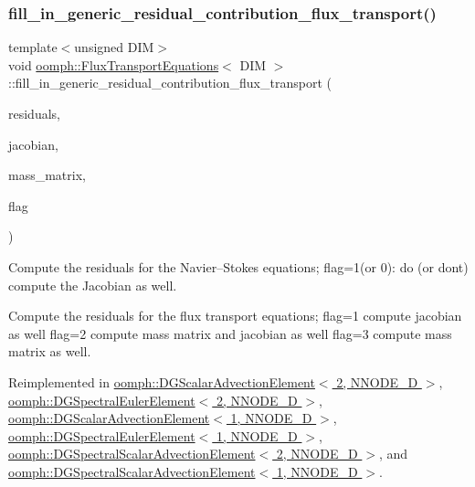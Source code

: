 \subsubsection{\texorpdfstring{fill\+\_\+in\+\_\+generic\+\_\+residual\+\_\+contribution\+\_\+flux\+\_\+transport()}{fill\_in\_generic\_residual\_contribution\_flux\_transport()}}
{\footnotesize\ttfamily template$<$unsigned D\+IM$>$ \\
void \hyperlink{classoomph_1_1FluxTransportEquations}{oomph\+::\+Flux\+Transport\+Equations}$<$ D\+IM $>$\+::fill\+\_\+in\+\_\+generic\+\_\+residual\+\_\+contribution\+\_\+flux\+\_\+transport (\begin{DoxyParamCaption}\item[{\hyperlink{classoomph_1_1Vector}{Vector}$<$ double $>$ \&}]{residuals,  }\item[{\hyperlink{classoomph_1_1DenseMatrix}{Dense\+Matrix}$<$ double $>$ \&}]{jacobian,  }\item[{\hyperlink{classoomph_1_1DenseMatrix}{Dense\+Matrix}$<$ double $>$ \&}]{mass\+\_\+matrix,  }\item[{unsigned}]{flag }\end{DoxyParamCaption})\hspace{0.3cm}{\ttfamily [virtual]}}



Compute the residuals for the Navier--Stokes equations; flag=1(or 0)\+: do (or don\textquotesingle{}t) compute the Jacobian as well. 

Compute the residuals for the flux transport equations; flag=1 compute jacobian as well flag=2 compute mass matrix and jacobian as well flag=3 compute mass matrix as well. 

Reimplemented in \hyperlink{classoomph_1_1DGScalarAdvectionElement_3_012_00_01NNODE__1D_01_4_a2c33e2b2f4e41b504d77bd86881f0869}{oomph\+::\+D\+G\+Scalar\+Advection\+Element$<$ 2, N\+N\+O\+D\+E\+\_\+D $>$}, \hyperlink{classoomph_1_1DGSpectralEulerElement_3_012_00_01NNODE__1D_01_4_a91aa95f61d0d91d89f3d899fbb4fdad3}{oomph\+::\+D\+G\+Spectral\+Euler\+Element$<$ 2, N\+N\+O\+D\+E\+\_\+D $>$}, \hyperlink{classoomph_1_1DGScalarAdvectionElement_3_011_00_01NNODE__1D_01_4_af3ef17f8ddb6034430fb873ea8dd4ba3}{oomph\+::\+D\+G\+Scalar\+Advection\+Element$<$ 1, N\+N\+O\+D\+E\+\_\+D $>$}, \hyperlink{classoomph_1_1DGSpectralEulerElement_3_011_00_01NNODE__1D_01_4_ae0ae9526ab9aae474a1e834f32dc2580}{oomph\+::\+D\+G\+Spectral\+Euler\+Element$<$ 1, N\+N\+O\+D\+E\+\_\+D $>$}, \hyperlink{classoomph_1_1DGSpectralScalarAdvectionElement_3_012_00_01NNODE__1D_01_4_a9eff513d77d731a1d2492289fd640cb0}{oomph\+::\+D\+G\+Spectral\+Scalar\+Advection\+Element$<$ 2, N\+N\+O\+D\+E\+\_\+D $>$}, and \hyperlink{classoomph_1_1DGSpectralScalarAdvectionElement_3_011_00_01NNODE__1D_01_4_ac24a1132d34b1062498ebf6010379017}{oomph\+::\+D\+G\+Spectral\+Scalar\+Advection\+Element$<$ 1, N\+N\+O\+D\+E\+\_\+D $>$}.



